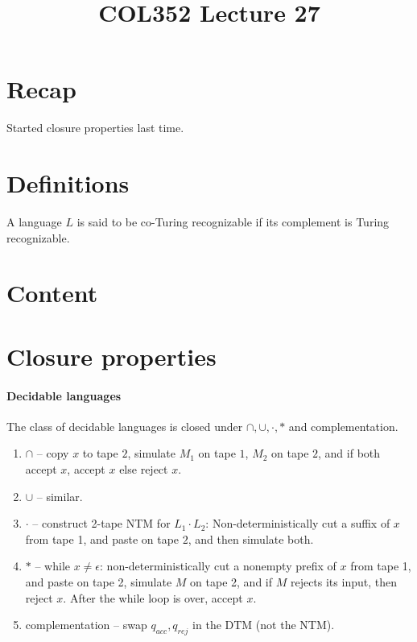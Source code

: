 \documentclass[a4paper]{article}
\title{\textbf{COL352 Lecture 27}}
\date{}
\begin{document}
\maketitle
\tableofcontents

\section{Recap}

Started closure properties last time.

\section{Definitions}

\begin{defn}
    A language $L$ is said to be co-Turing recognizable if its complement is Turing recognizable.
\end{defn}

\section{Content}

\section{Closure properties}
\paragraph{Decidable languages} The class of decidable languages is closed under $\cap, \cup, \cdot, *$ and complementation.
        \begin{enumerate}
            \item $\cap$ -- copy $x$ to tape $2$, simulate $M_1$ on tape $1$, $M_2$ on tape $2$, and if both accept $x$, accept $x$ else reject $x$.
            \item $\cup$ -- similar.
            \item $\cdot$ -- construct 2-tape NTM for $L_1 \cdot L_2$: Non-deterministically cut a suffix of $x$ from tape 1, and paste on tape $2$, and then simulate both.
            \item $*$ -- while $x \ne \epsilon$: non-deterministically cut a nonempty prefix of $x$ from tape 1, and paste on tape 2, simulate $M$ on tape 2, and if $M$ rejects its input, then
                reject $x$. After the while loop is over, accept $x$.
            \item complementation -- swap $q_{acc}, q_{rej}$ in the DTM (not the NTM).
        \end{enumerate}
\end{document}
